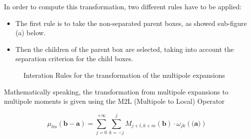 \documentclass[10pt,twoside,a4paper]{report}
\begin{document}
	In order to compute this transformation, two different rules have to be applied:
	
	\begin{itemize}
	
	\item The first rule is to take the non-separated parent boxes, as showed sub-figure (a) below.
	\item Then the children of the parent box are selected, taking into account the separation criterion for the child boxes.
	
	\end{itemize}	   
   
	 
 \begin{figure}[H]
    \centering 
    \caption{Interation Rules for the transformation of the multipole expansions}
    \label{fig:multipole}
   \end{figure}   
   
	  Mathematically speaking, the transformation from multipole expansions to multipole moments is given using the  M2L (Multipole to Local) Operator
	  
	  \begin{equation}
	  \mu_{lm}(\textbf{b} - \textbf{a}) = \sum\limits_{j = 0}^{+\infty} \sum\limits_{k=-j}^{j}
	  M_{j+l,k+m}(\textbf{b}) \cdot \omega_{jk}(\textbf{(a)})
	  \end{equation}
   
\end{document}
